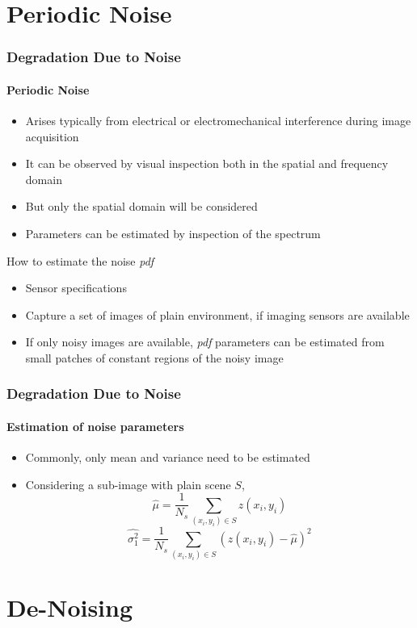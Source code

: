 \documentclass{beamer}
\begin{document}
\section{Periodic Noise}
\begin{frame}	
\frametitle{Degradation Due to Noise}
\framesubtitle{Periodic Noise}
\begin{itemize}
	\item Arises typically from electrical or electromechanical interference during image acquisition
	\item It can be observed by visual inspection both in the spatial and frequency domain 
	\item But only the spatial domain will be considered
	\item Parameters can be estimated by inspection of the spectrum
\end{itemize}
\begin{block}{How to estimate the noise \textit{pdf}}
\scriptsize{
\begin{itemize}
	\item Sensor specifications
	\item Capture a set of images of plain environment, if imaging sensors are available 
	\item If only noisy images are available, \textit{pdf} parameters can be estimated from small patches of constant regions of the noisy image
\end{itemize}
}
\end{block}
\end{frame}
\begin{frame}
\frametitle{Degradation Due to Noise}
\framesubtitle{Estimation of noise parameters}
\begin{itemize}
	\item Commonly, only mean and variance need to be estimated 
	\item Considering a sub-image with plain scene $S$, 
	$$ \hat{\mu} = \frac{1}{N_{s}} \sum_{(x_{i},y_{i})\in S} z(x_{i}, y_{i})$$ 
	$$ \hat{\sigma_{1}^{2}} = \frac{1}{N_{s}}\sum_{(x_{i},y_{i})\in S}(z(x_{i},y_{i})- \hat{\mu})^2$$ 
\end{itemize}
\end{frame}
\section{De-Noising}
\end{document}
